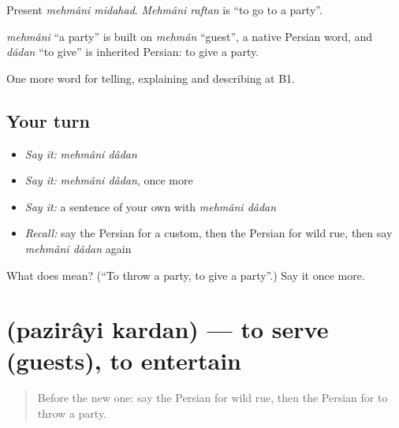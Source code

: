 Present \emph{mehmâni midahad}. \emph{Mehmâni raftan} is \textquotedblleft{}to go to a party\textquotedblright{}.

\begin{cousinweb}
\emph{mehmâni} \textquotedblleft{}a party\textquotedblright{} is built on \emph{mehmân} \textquotedblleft{}guest\textquotedblright{}, a native Persian word, and \emph{dâdan} \textquotedblleft{}to give\textquotedblright{} is inherited Persian: to give a party.
\end{cousinweb}

\begin{grammarlens}[title={What you've built}]
One more word for telling, explaining and describing at B1.
\end{grammarlens}

\subsection*{Your turn}
\begin{itemize}
\raggedright
  \item \emph{Say it:} \emph{mehmâni dâdan}
  \item \emph{Say it:} \emph{mehmâni dâdan}, once more
  \item \emph{Say it:} a sentence of your own with \emph{mehmâni dâdan}
  \item \emph{Recall:} say the Persian for a custom, then the Persian for wild rue, then say \emph{mehmâni dâdan} again
\end{itemize}

\begin{tcolorbox}[breakable,colback=teal!4,colframe=teal!35!black,title={Before you move on}]
What does   mean? (\textquotedblleft{}To throw a party, to give a party\textquotedblright{}.) Say it once more.
\end{tcolorbox}
\section[\texorpdfstring{\fa{پذیرایی} \fa{کردن} (pazirâyi kardan)}{پذیرایی کردن (pazirâyi kardan)}]{  (pazirâyi kardan) — to serve (guests), to entertain}

\label{lesson:FA-C341-pazirayi-kardan}



\begin{quote}
Before the new one: say the Persian for wild rue, then the Persian for to throw a party.
\end{quote}

